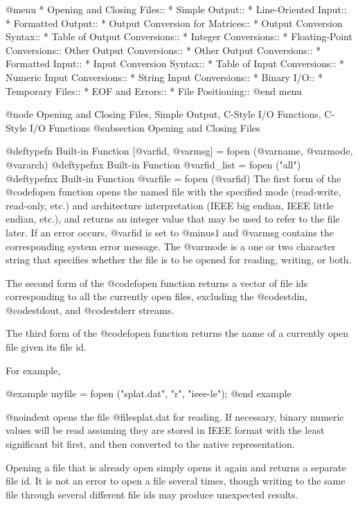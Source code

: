 @menu
* Opening and Closing Files::   
* Simple Output::               
* Line-Oriented Input::         
* Formatted Output::            
* Output Conversion for Matrices::  
* Output Conversion Syntax::    
* Table of Output Conversions::  
* Integer Conversions::         
* Floating-Point Conversions::  Other Output Conversions::    
* Other Output Conversions::    
* Formatted Input::             
* Input Conversion Syntax::     
* Table of Input Conversions::  
* Numeric Input Conversions::   
* String Input Conversions::    
* Binary I/O::                  
* Temporary Files::             
* EOF and Errors::              
* File Positioning::            
@end menu

@node Opening and Closing Files, Simple Output, C-Style I/O Functions, C-Style I/O Functions
@subsection Opening and Closing Files

@deftypefn {Built-in Function} {[@var{fid}, @var{msg}] =} fopen (@var{name}, @var{mode}, @var{arch})
@deftypefnx {Built-in Function} {@var{fid_list} =} fopen ("all")
@deftypefnx {Built-in Function} {@var{file} =} fopen (@var{fid})
The first form of the @code{fopen} function opens the named file with
the specified mode (read-write, read-only, etc.) and architecture
interpretation (IEEE big endian, IEEE little endian, etc.), and returns
an integer value that may be used to refer to the file later.  If an
error occurs, @var{fid} is set to @minus{}1 and @var{msg} contains the
corresponding system error message.  The @var{mode} is a one or two
character string that specifies whether the file is to be opened for
reading, writing, or both.

The second form of the @code{fopen} function returns a vector of file ids
corresponding to all the currently open files, excluding the
@code{stdin}, @code{stdout}, and @code{stderr} streams.

The third form of the @code{fopen} function returns the name of a
currently open file given its file id.

For example,

@example
myfile = fopen ("splat.dat", "r", "ieee-le");
@end example

@noindent
opens the file @file{splat.dat} for reading.  If necessary, binary
numeric values will be read assuming they are stored in IEEE format with
the least significant bit first, and then converted to the native
representation.

Opening a file that is already open simply opens it again and returns a
separate file id.  It is not an error to open a file several times,
though writing to the same file through several different file ids may
produce unexpected results.

